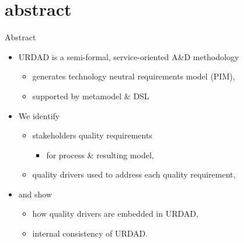 \section{abstract}

\begin{frame}{Abstract}
\initclock

  \begin{itemize}
   \item<+-| alert@+> URDAD is a semi-formal, service-oriented A\&D methodology 
      \begin{itemize}
	\item generates technology neutral requirements model (PIM),
	\item supported by metamodel \& DSL
      \end{itemize}
    \item<+-| alert@+> We identify
    \begin{itemize}
    \item stakeholders quality requirements 
	\begin{itemize}
	  \item for process \& resulting model,
	\end{itemize}
    \item quality drivers used to address each quality requirement,
    \end{itemize}
      \item<+-| alert@+> and show
      \begin{itemize}
	\item how quality drivers are embedded in URDAD,
	\item internal consistency of URDAD.
      \end{itemize}
  \end{itemize}

\end{frame}
